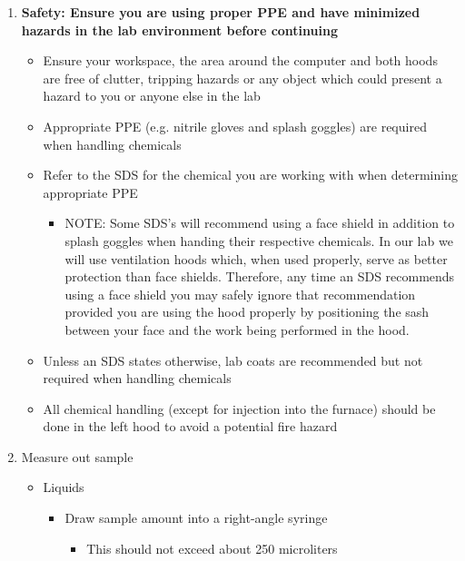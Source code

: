 \documentclass[letterpaper,11pt]{article}
\begin{document}
\begin{enumerate}
    \item \textbf{Safety: Ensure you are using proper PPE and have minimized 
        hazards in the lab environment before continuing}
            
            \begin{itemize}
            \item Ensure your workspace, the area around the computer and 
                both hoods are free of clutter, tripping hazards or any object 
                which could present a hazard to you or anyone else in the lab
            \item Appropriate PPE (e.g. nitrile gloves and splash goggles) are 
                required when handling chemicals
            \item Refer to the SDS for the chemical you are working 
                with when determining appropriate PPE
                \begin{itemize}
                \item NOTE: Some SDS's will recommend using a face shield in 
                    addition to splash goggles when handing their respective 
                    chemicals. In our lab we will use ventilation hoods which, 
                    when used properly, serve as better protection than face 
                    shields. Therefore, any time an SDS recommends using a 
                    face shield you may safely ignore that recommendation 
                    provided you are using the hood properly by positioning the 
                    sash between your face and the work being performed in 
                    the hood.
                \end{itemize}
                
            \item Unless an SDS states otherwise, lab coats are recommended but 
                not required when handling chemicals
            \item All chemical handling (except for injection into the furnace) 
                should be done in the left hood to avoid a potential fire hazard 
            \end{itemize}
    
    \item Measure out sample
        \begin{itemize}
        \item Liquids
            \begin{itemize}
            \item Draw sample amount into a right-angle syringe
                \begin{itemize}
                \item This should not exceed about 250 microliters
                \end{itemize}
            \end{itemize}
        

\end{itemize}
\end{enumerate}
\end{document}
